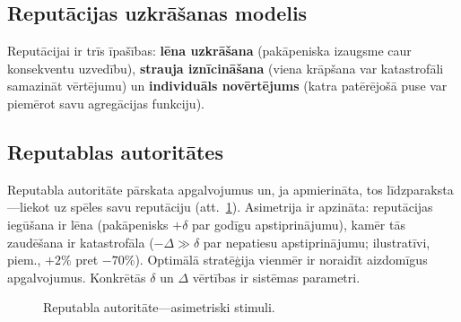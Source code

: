 \documentclass[11pt,a4paper,twocolumn]{article}
\begin{document}
\subsection{Reputācijas uzkrāšanas modelis}

Reputācijai ir trīs īpašības: \textbf{lēna uzkrāšana} (pakāpeniska izaugsme caur konsekventu uzvedību), \textbf{strauja iznīcināšana} (viena krāpšana var katastrofāli samazināt vērtējumu) un \textbf{individuāls novērtējums} (katra patērējošā puse var piemērot savu agregācijas funkciju).

\subsection{Reputablas autoritātes}

Reputabla autoritāte pārskata apgalvojumus un, ja apmierināta, tos līdzparaksta---liekot uz spēles savu reputāciju (att.~\ref{fig:authority}). Asimetrija ir apzināta: reputācijas iegūšana ir lēna (pakāpenisks $+\delta$ par godīgu apstiprinājumu), kamēr tās zaudēšana ir katastrofāla ($-\Delta \gg \delta$ par nepatiesu apstiprinājumu; ilustratīvi, piem., $+2\%$ pret $-70\%$). Optimālā stratēģija vienmēr ir noraidīt aizdomīgus apgalvojumus. Konkrētās $\delta$ un $\Delta$ vērtības ir sistēmas parametri.

\begin{figure}[ht]
\centering
{}
\caption{Reputabla autoritāte---asimetriski stimuli.}
\label{fig:authority}
\end{figure}
\end{document}
